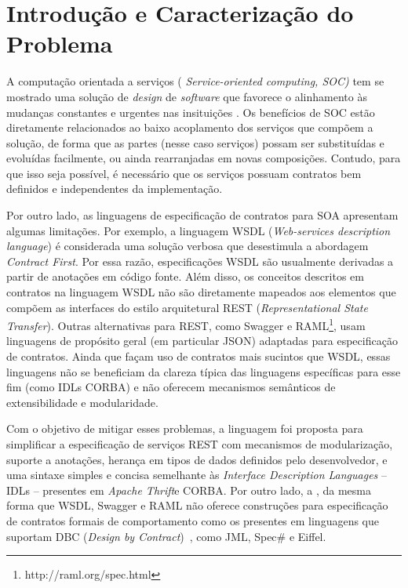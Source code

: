 \section{Introdução e Caracterização do Problema}\label{sec:introducao}

A computação orientada a serviços ( \emph{Service-oriented computing, SOC)} tem
se mostrado uma solução de \textit{design} de \textit{software} que favorece o
alinhamento às mudanças constantes e urgentes nas insituições
\cite{chen2008towards}. Os benefícios de SOC estão diretamente relacionados ao
baixo acoplamento dos serviços que compõem a solução, de forma que as partes
(nesse caso serviços) possam ser substituídas e evoluídas facilmente, ou ainda
rearranjadas em novas composições. Contudo, para que isso seja possível, é
necessário que os serviços possuam contratos bem definidos e independentes da
implementação.

Por outro lado, as linguagens de especificação de contratos para SOA apresentam
algumas limitações. Por exemplo, a linguagem WSDL (\emph{Web-services
description language}) \cite{zur2005developing} é considerada uma solução
verbosa que desestimula a abordagem \textit{Contract First}. Por essa razão,
especificações WSDL são usualmente derivadas a partir de anotações em código
fonte.
Além disso, os conceitos descritos em contratos na linguagem WSDL não são
diretamente mapeados aos elementos que compõem as interfaces do estilo
arquitetural REST (\emph{Representational State Transfer}).
Outras alternativas para REST, como Swagger e
RAML\footnote{http://raml.org/spec.html}, usam linguagens de propósito geral (em
particular JSON) adaptadas para especificação de contratos. Ainda que façam uso
de contratos mais sucintos que WSDL, essas linguagens não se
beneficiam da clareza típica das linguagens específicas para esse fim (como IDLs CORBA) e não oferecem
mecanismos semânticos de extensibilidade e modularidade.

Com o objetivo de mitigar esses problemas, a linguagem \neoidl foi proposta
para simplificar a especificação de serviços REST com mecanismos de modularização,
suporte a anotações, herança em tipos de dados definidos pelo desenvolvedor, e
uma sintaxe simples e concisa semelhante às \textit{Interface Description
Languages} -- IDLs -- presentes em \textit{Apache Thrift}\texttrademark e
CORBA\texttrademark. Por outro lado, a \neoidl, da mesma forma que WSDL, Swagger
e RAML não oferece construções para especificação de contratos formais de
comportamento como os presentes em linguagens que suportam DBC (\emph{Design by
Contract})~\cite{meyer1992applying}, como JML, Spec\# e Eiffel.

